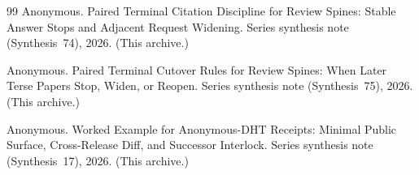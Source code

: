 \documentclass[11pt]{article}
\begin{document}
\begin{thebibliography}{99}
Anonymous.
\newblock Paired Terminal Citation Discipline for Review Spines: Stable Answer Stops and Adjacent Request Widening.
\newblock Series synthesis note (Synthesis~74), 2026. (This archive.)

Anonymous.
\newblock Paired Terminal Cutover Rules for Review Spines: When Later Terse Papers Stop, Widen, or Reopen.
\newblock Series synthesis note (Synthesis~75), 2026. (This archive.)

Anonymous.
\newblock Worked Example for Anonymous-DHT Receipts: Minimal Public Surface, Cross-Release Diff, and Successor Interlock.
\newblock Series synthesis note (Synthesis~17), 2026. (This archive.)

\end{thebibliography}
\end{document}
